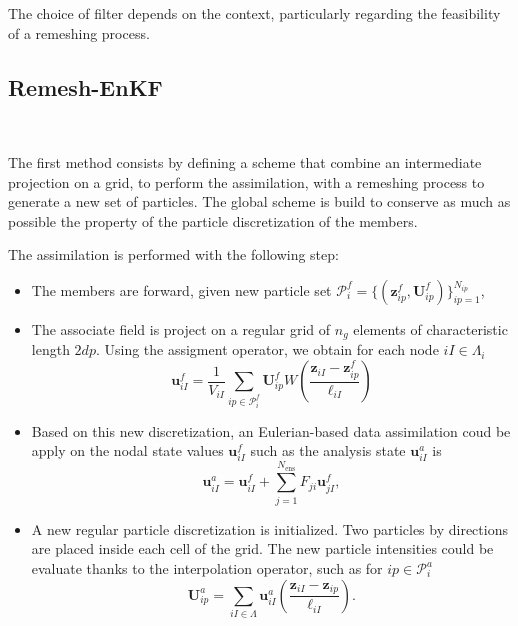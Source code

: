 The choice of filter depends on the context, particularly regarding the feasibility of a remeshing process.

\subsection{Remesh-EnKF}~\label{remesh_enkf}

The first method consists by defining a scheme that combine an intermediate projection on a grid, to perform the assimilation, with a remeshing process to generate a new set of particles. The global scheme is build to conserve as much as possible the property of the particle discretization of the members.

The assimilation is performed with the following step:
\begin{itemize}
    \item The members are forward, given new particle set $\mathcal{P}^f_i = \{(\bm z^f_{ip}, \bm U^f_{ip})\}_{ip = 1}^{N_{ip}}$,
    \item The associate field is project on a regular grid of $n_g$ elements of characteristic length $2dp$. Using the assigment operator, we obtain for each node $iI \in \Lambda_{i}$
          \begin{equation*}
              \bm{u}^f_{iI} = \frac1{V_{iI}} \sum_{ip \in \mathcal P^f_i} \bm U^f_{ip}  W \left(\frac{\bm z_{iI} - \bm z^f_{ip}}{\ell_{iI}} \right)
          \end{equation*}
    \item Based on this new discretization, an Eulerian-based data assimilation coud be apply on the nodal state values $ \bm{u}^f_{iI}$ such as the analysis state $\bm{u}_{iI}^a$ is
          \begin{equation*}
              \bm{u}^a_{iI} = \bm{u}^f_{iI} + \sum_{j=1}^{N_{\text{ens}}} F_{ji} \bm{u}^f_{jI},
          \end{equation*}
    \item A new regular particle discretization is initialized. Two particles by directions are placed inside each cell of the grid. The new particle intensities could be evaluate thanks to the interpolation operator, such as for $ip \in \mathcal P_i^a$
          \begin{equation*}
              \bm U_{ip}^a = \sum_{iI \in \Lambda} \bm u^a_{iI} \left(\frac{\bm z_{iI} - \bm z_{ip}}{\ell_{iI}} \right).
          \end{equation*}
\end{itemize}

